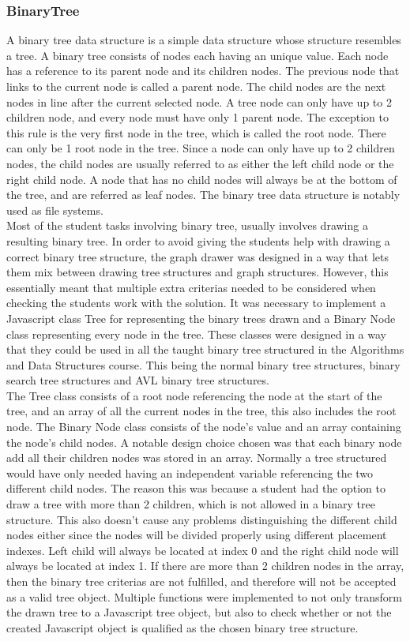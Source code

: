 \subsubsection{BinaryTree}
A binary tree data structure is a simple data structure whose structure resembles a tree. A binary tree consists of nodes each having an unique value. Each node has a reference to its parent node and its children nodes. The previous node that links to the current node is called a parent node. The child nodes are the next nodes in line after the current selected node. A tree node can only have up to 2 children node, and every node must have only 1 parent node. The exception to this rule is the very first node in the tree, which is called the root node. There can only be 1 root node in the tree. Since a node can only have up to 2 children nodes, the child nodes are usually referred to as either the left child node or the right child node. A node that has no child nodes will always be at the bottom of the tree, and are referred as leaf nodes. The binary tree data structure is notably used as file systems. 
\\[11pt]
Most of the student tasks involving binary tree, usually involves drawing a resulting binary tree. In order to avoid giving the students help with drawing a correct binary tree structure, the graph drawer was designed in a way that lets them mix between drawing tree structures and graph structures. However, this essentially meant that multiple extra criterias  needed to be considered when checking the students work with the solution. It was necessary to implement a Javascript class Tree for representing the binary trees drawn and a Binary Node class representing every node in the tree. These classes were designed in a way that they could be used in all the taught binary tree structured in the Algorithms and Data Structures course. This being the normal binary tree structures, binary search tree structures and AVL binary tree structures. 
\\[11pt]
The Tree class consists of a root node referencing the node at the start of the tree, and an array of all the current nodes in the tree, this also includes the root node. The Binary Node class consists of the node's value and an array containing the node's child nodes. A notable design choice chosen was that each binary node add all their children nodes was stored in an array. Normally a tree structured would have only needed having an independent variable referencing the two different child nodes. The reason this was because a student had the option to draw a tree with more than 2 children, which is not allowed in a binary tree structure. This also doesn't cause any problems distinguishing the different child nodes either since the nodes will be divided properly using different placement indexes. Left child will always be located at index 0 and the right child node will always be located at index 1. If there are more than 2 children nodes in the array, then the binary tree criterias are not fulfilled, and therefore will not be accepted as a valid tree object. Multiple functions were implemented to not only transform the drawn tree to a Javascript tree object, but also to check whether or not the created Javascript object is qualified as the chosen binary tree structure. 
